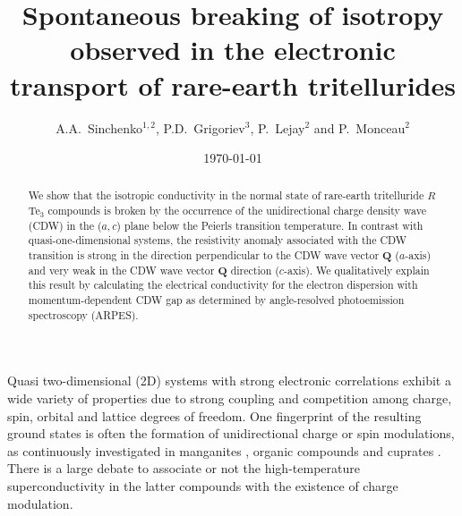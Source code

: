\importpackages{}
\graphicspath{ {./images/} }



\title{Spontaneous breaking of isotropy observed in the electronic transport of rare-earth tritellurides}
\date{\today}
\author{A.A.~Sinchenko$^{1,2}$, P.D.~Grigoriev$^{3}$, P.~Lejay$^{2}$ and
P.~Monceau$^{2}$}

\address{$^{1}$Kotelnikov Institute of Radioengineering and Electronics of
RAS, Mokhovaya 11-7, 125009 Moscow, Russia}

\address{$^{2}$Univ. Grenoble Alpes, Inst. Neel, F-38042 Grenoble, France, CNRS, Inst. Neel, F-38042 Grenoble, France}

\address{$^{3}$L. D. Landau Institute for Theoretical Physics, 142432
Chernogolovka, Russia}


\begin{abstract}
We show that the isotropic conductivity in the normal state of
rare-earth tritelluride $R$Te$_3$ compounds is broken by the
occurrence of the unidirectional charge density wave (CDW) in the
($a,c$) plane below the Peierls transition temperature. In contrast
with quasi-one-dimensional systems, the resistivity anomaly
associated with the CDW transition is strong in the direction
perpendicular to the CDW wave vector $\mathbf{Q}$ ($a$-axis) and
very weak in the CDW wave vector $\mathbf{Q}$ direction ($c$-axis).
We qualitatively explain this result by calculating the electrical
conductivity for the electron dispersion with momentum-dependent CDW
gap as determined by angle-resolved photoemission spectroscopy
(ARPES).
\end{abstract}


\maketitle

\draft

Quasi two-dimensional (2D) systems with strong electronic
correlations exhibit a wide variety of properties due to strong
coupling and competition among charge, spin, orbital and lattice
degrees of freedom. One fingerprint of the resulting ground states
is often the formation of unidirectional charge or spin modulations,
as continuously investigated in manganites \cite{Sun2011}, organic
compounds \cite{Seo2000} and cuprates \cite{Kivelson2003,Vojta2009}.
There is a large debate to associate or not the high-temperature
superconductivity in the latter compounds with the existence of
charge modulation.

